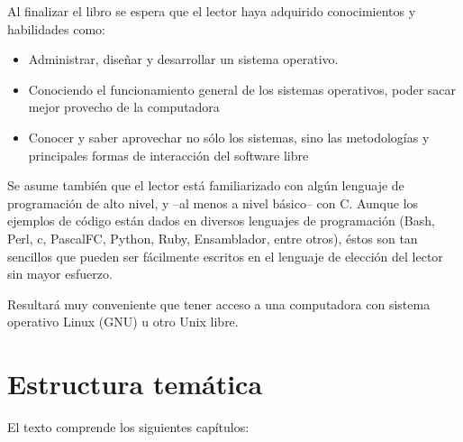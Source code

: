 \documentclass[11pt,fleqn]{book} %
\begin{document}
Al finalizar el libro se espera que el lector haya adquirido conocimientos
y habilidades como:

\begin{itemize}
\item Administrar, diseñar y desarrollar un sistema operativo.
\item Conociendo el funcionamiento general de los sistemas operativos,
      poder sacar mejor provecho de la computadora
\item Conocer y saber aprovechar no sólo los sistemas, sino las
   metodologías y principales formas de interacción del software libre
\end{itemize}
 
Se asume también que el lector está familiarizado 
con algún lenguaje de programación
de alto nivel, y –al menos a nivel básico– con C.
Aunque los ejemplos de código están dados en diversos lenguajes de programación
(Bash, Perl, c, PascalFC, Python, Ruby, Ensamblador, entre otros), éstos
son tan sencillos que pueden ser fácilmente escritos en el lenguaje 
de elección del lector sin mayor esfuerzo.

Resultará muy conveniente que tener acceso a una computadora con
sistema operativo Linux (GNU) u otro Unix libre. 

\section*{Estructura temática}

El texto comprende los siguientes capítulos:
\end{document}
